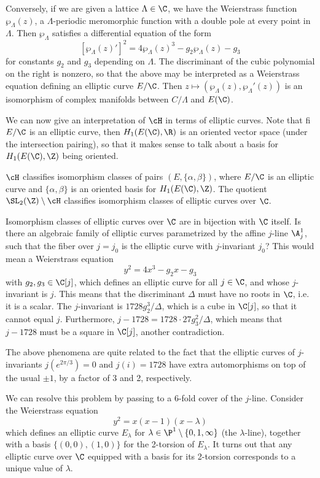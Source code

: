 Conversely, if we are given a lattice $\Lambda \in \C$, we have the Weierstrass function $\wp_{\Lambda}(z)$, a $\Lambda$-periodic meromorphic function with a double pole at every point in $\Lambda$. Then $\wp_\Lambda$ satisfies a differential equation of the form
	\[
	[\wp_{\Lambda}(z)']^2= 4 \wp_\Lambda(z)^3 - g_2 \wp_\Lambda(z) - g_3
	\]
for constants $g_2$ and $g_3$ depending on $\Lambda$. The discriminant of the cubic polynomial on the right is nonzero, so that the above may be interpreted as a Weierstrass equation defining an elliptic curve $E/\C$. Then $z \mapsto (\wp_\Lambda(z), \wp_\Lambda'(z))$ is an isomorphism of complex manifolds between $C/\Lambda$ and $E(\C)$. 


We can now give an interpretation of $\cH$ in terms of elliptic curves. Note that fi $E/\C$ is an elliptic curve, then $H_1(E(\C),\R)$ is an oriented vector space (under the intersection pairing), so that it makes sense to talk about a basis for $H_1(E(\C),\Z)$ being oriented. 


\begin{prop} %
$\cH$ classifies isomorphism classes of pairs $(E,\{\alpha,\beta\})$, where $E/\C$ is an elliptic curve and $\{\alpha,\beta\}$ is an oriented basis for $H_1(E(\C),\Z)$. The quotient $\SL_2(\Z) \setminus \cH$ classifies isomorphism classes of elliptic curves over $\C$. 
\end{prop}


Isomorphism classes of elliptic curves over $\C$ are in bijection with $\C$ itself. Is there an algebraic family of elliptic curves parametrized by the affine $j$-line $\A_j^1$, such that the fiber over $j= j_0$ is the elliptic curve with $j$-invariant $j_0$? This would mean a Weierstrass equation
	\[
	y^2= 4x^3 - g_2x - g_3
	\]
with $g_2,g_3 \in \C[j]$, which defines an elliptic curve for all $j \in \C$, and whose $j$-invariant is $j$. This means that the discriminant $\Delta$ must have no roots in $\C$, i.e. it is a scalar. The $j$-invariant is $1728g_2^3/\Delta$, which is a cube in $\C[j]$, so that it cannot equal $j$. Furthermore, $j - 1728= 1728 \cdot 27 g_3^2/\Delta$, which means that $j - 1728$ must be a square in $\C[j]$, another contradiction. 


The above phenomena are quite related to the fact that the elliptic curves of $j$-invariants $j(e^{2\pi/3})= 0$ and $j(i)= 1728$ have extra automorphisms on top of the usual $\pm1$, by a factor of 3 and 2, respectively.


We can resolve this problem by passing to a 6-fold cover of the $j$-line. Consider the Weierstrass equation
	\[
	y^2= x(x - 1)(x - \lambda)
	\]
which defines an elliptic curve $E_\lambda$ for $\lambda \in \P^1 \setminus \{0,1,\infty\}$ (the $\lambda$-line), together with a basis $\{(0,0), (1,0)\}$ for the 2-torsion of $E_\lambda$. It turns out that any elliptic curve over $\C$ equipped with a basis for its 2-torsion corresponds to a unique value of $\lambda$.


